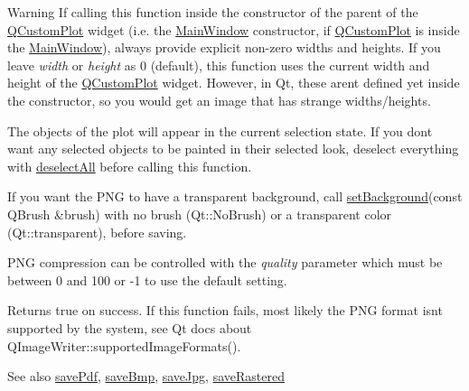 \begin{DoxyWarning}{Warning}
If calling this function inside the constructor of the parent of the \hyperlink{classQCustomPlot}{Q\+Custom\+Plot} widget (i.\+e. the \hyperlink{classMainWindow}{Main\+Window} constructor, if \hyperlink{classQCustomPlot}{Q\+Custom\+Plot} is inside the \hyperlink{classMainWindow}{Main\+Window}), always provide explicit non-\/zero widths and heights. If you leave {\itshape width} or {\itshape height} as 0 (default), this function uses the current width and height of the \hyperlink{classQCustomPlot}{Q\+Custom\+Plot} widget. However, in Qt, these aren\textquotesingle{}t defined yet inside the constructor, so you would get an image that has strange widths/heights.
\end{DoxyWarning}
The objects of the plot will appear in the current selection state. If you don\textquotesingle{}t want any selected objects to be painted in their selected look, deselect everything with \hyperlink{classQCustomPlot_a9d4808ab925b003054085246c92a257c}{deselect\+All} before calling this function.

If you want the P\+NG to have a transparent background, call \hyperlink{classQCustomPlot_a130358592cfca353ff3cf5571b49fb00}{set\+Background}(const Q\+Brush \&brush) with no brush (Qt\+::\+No\+Brush) or a transparent color (Qt\+::transparent), before saving.

P\+NG compression can be controlled with the {\itshape quality} parameter which must be between 0 and 100 or -\/1 to use the default setting.

Returns true on success. If this function fails, most likely the P\+NG format isn\textquotesingle{}t supported by the system, see Qt docs about Q\+Image\+Writer\+::supported\+Image\+Formats().

\begin{DoxySeeAlso}{See also}
\hyperlink{classQCustomPlot_a632da44c6d94ea8b271eb483b08b5114}{save\+Pdf}, \hyperlink{classQCustomPlot_a6629d9e8e6da4bf18055ee0257fdce9a}{save\+Bmp}, \hyperlink{classQCustomPlot_a490c722092d1771e8ce4a7a73dfd84ab}{save\+Jpg}, \hyperlink{classQCustomPlot_ab528b84cf92baabe29b1d0ef2f77c93e}{save\+Rastered} 
\end{DoxySeeAlso}
